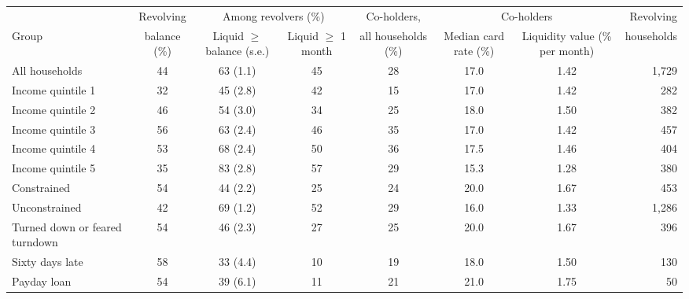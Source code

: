\begin{tabular}{lccccccr}
\toprule
 & Revolving & \multicolumn{2}{c}{Among revolvers (\%)} & Co-holders, & \multicolumn{2}{c}{Co-holders} & Revolving \\
\cmidrule(lr){3-4} \cmidrule(lr){6-7}
Group & balance (\%) & Liquid $\ge$ balance (s.e.) & Liquid $\ge$ 1 month & all households (\%) & Median card rate (\%) & Liquidity value (\% per month) & households \\
\midrule
All households & 44 & 63 (1.1) & 45 & 28 & 17.0 & 1.42 & 1,729 \\
\addlinespace
Income quintile 1 & 32 & 45 (2.8) & 42 & 15 & 17.0 & 1.42 & 282 \\
Income quintile 2 & 46 & 54 (3.0) & 34 & 25 & 18.0 & 1.50 & 382 \\
Income quintile 3 & 56 & 63 (2.4) & 46 & 35 & 17.0 & 1.42 & 457 \\
Income quintile 4 & 53 & 68 (2.4) & 50 & 36 & 17.5 & 1.46 & 404 \\
Income quintile 5 & 35 & 83 (2.8) & 57 & 29 & 15.3 & 1.28 & 380 \\
\addlinespace
Constrained & 54 & 44 (2.2) & 25 & 24 & 20.0 & 1.67 & 453 \\
Unconstrained & 42 & 69 (1.2) & 52 & 29 & 16.0 & 1.33 & 1,286 \\
\addlinespace
Turned down or feared turndown & 54 & 46 (2.3) & 27 & 25 & 20.0 & 1.67 & 396 \\
Sixty days late & 58 & 33 (4.4) & 10 & 19 & 18.0 & 1.50 & 130 \\
Payday loan & 54 & 39 (6.1) & 11 & 21 & 21.0 & 1.75 & 50 \\
\bottomrule
\end{tabular}
